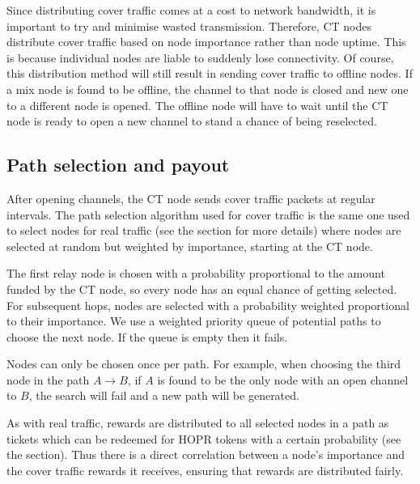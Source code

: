 Since distributing cover traffic comes at a cost to network bandwidth, it is important to try and minimise wasted transmission. Therefore, CT nodes distribute cover traffic based on node importance rather than node uptime. This is because individual nodes are liable to suddenly lose connectivity. Of course, this distribution method will still result in sending cover traffic to offline nodes. If a mix node is found to be offline, the channel to that node is closed and new one to a different node is opened. The offline node will have to wait until the CT node is ready to open a new channel to stand a chance of being reselected.

\subsection{Path selection and payout}
After opening channels, the CT node sends cover traffic packets at regular intervals. The path selection algorithm used for cover traffic is the same one used to select nodes for real traffic (see the  section for more details) where nodes are selected at random but weighted by importance, starting at the CT node.

The first relay node is chosen with a probability proportional to the amount funded by the CT node, so every node has an equal chance of getting selected. For subsequent hops, nodes are selected with a probability weighted proportional to their importance. We use a weighted priority queue of potential paths to choose the next node. If the queue is empty then it fails.

Nodes can only be chosen once per path. For example, when choosing the third node in the path $A\rightarrow B$, if $A$ is found to be the only node with an open channel to $B$, the search will fail and a new path will be generated.

 As with real traffic, rewards are distributed to all selected nodes in a path as tickets which can be redeemed for HOPR tokens with a certain probability (see the  section). Thus there is a direct correlation between a node's importance and the cover traffic rewards it receives, ensuring that rewards are distributed fairly.


